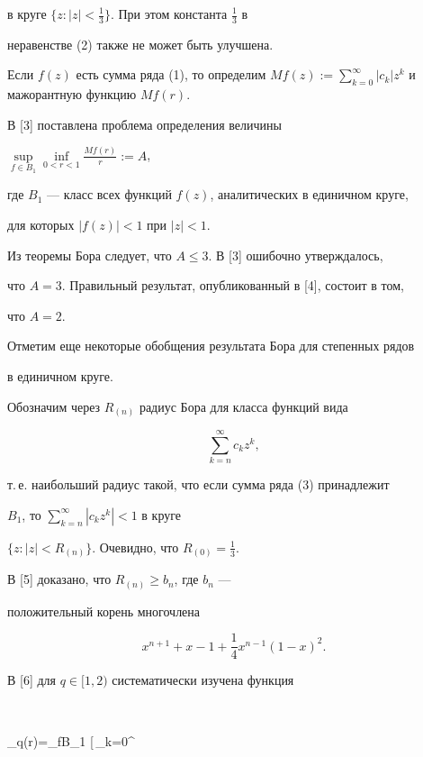 в круге $\{z: |z|< \frac{1}{3}\}$. При этом константа $\frac{1}{3}$ в


неравенстве (2) также не может быть улучшена.


Если $f(z)$ есть сумма ряда (1), то определим $Mf(z):=\sum\limits_{k=0}^


{\infty} | c_k| z^k$ и мажорантную функцию $Mf(r)$.


В [3] поставлена проблема определения величины


$\sup\limits_{f\in B_1} \inf\limits_{0<r<1}{\frac{Mf(r)}{r}}:=A$,


где $B_1$ --- класс всех функций $f(z)$, аналитических в единичном круге,


для которых $|f(z)|<1$ при $|z|<1$.


Из теоремы Бора следует, что $A\leq 3$. В [3] ошибочно утверждалось,


что $A=3$. Правильный результат, опубликованный в [4], состоит в том,


что $A=2$.





Отметим еще некоторые обобщения результата Бора для степенных рядов


в единичном круге.


Обозначим через $R_{(n)}$ радиус Бора для класса функций вида


\begin{equation}


\sum\limits_{k=n}^{\infty} c_k z^k,


\end{equation}


т.\,е. наибольший радиус такой, что если сумма ряда (3) принадлежит


$B_1$, то $\sum\limits_{k=n}^{\infty} | c_k z^k|<1$ в круге


$\{z: |z|<R_{(n)}\}$. Очевидно, что $R_{(0)}=\frac{1}{3}$.


В [5] доказано, что $R_{(n)}\geq b_n$, где $b_n$ ---


положительный корень многочлена


$$


x^{n+1}+x-1+\frac{1}{4}x^{n-1}(1-x)^2.


$$


В [6] для $q\in [1,2)$ систематически изучена функция


$$


\alpha_q(r)=\sup\limits_{f\in B_1} \bigg[\,\sum\limits_{k=0}^{\infty}


